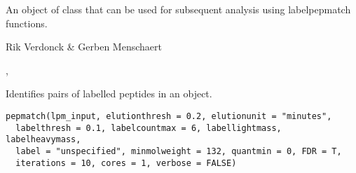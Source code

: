 \documentclass[letterpaper]{book}
\begin{document}
%
\begin{Value}
An object of class  that can be used for subsequent analysis using labelpepmatch functions.
\end{Value}
%
\begin{Author}\relax
Rik Verdonck \& Gerben Menschaert
\end{Author}
%
\begin{SeeAlso}\relax
{}, 
\end{SeeAlso}
%
\begin{Description}\relax
Identifies pairs of labelled peptides in an  object.
\end{Description}
%
\begin{Usage}
\begin{verbatim}
pepmatch(lpm_input, elutionthresh = 0.2, elutionunit = "minutes",
  labelthresh = 0.1, labelcountmax = 6, labellightmass, labelheavymass,
  label = "unspecified", minmolweight = 132, quantmin = 0, FDR = T,
  iterations = 10, cores = 1, verbose = FALSE)
\end{verbatim}
\end{Usage}
%
\end{document}

